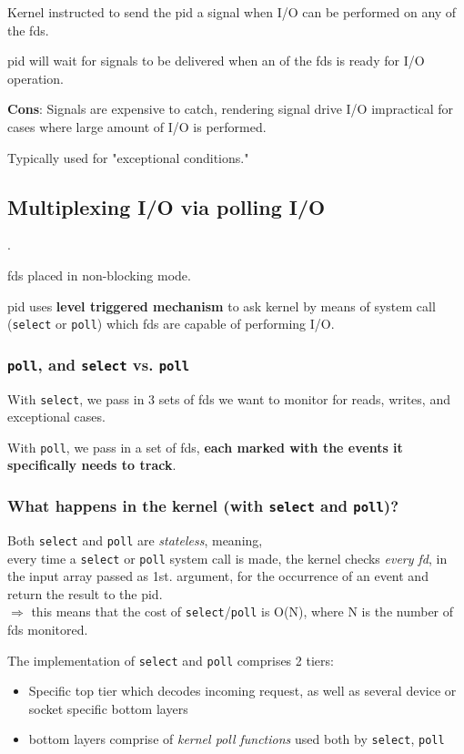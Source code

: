 \documentclass[10pt]{amsart}
\begin{document}
Kernel instructed to send the pid a signal when I/O can be performed on any of the fds.

pid will wait for signals to be delivered when an of the fds is ready for I/O operation.

\textbf{Cons}: Signals are expensive to catch, rendering signal drive I/O impractical for cases where large amount of I/O is performed.

Typically used for "exceptional conditions."

\subsection{Multiplexing I/O via polling I/O}.

fds placed in non-blocking mode.

pid uses \textbf{level triggered mechanism} to ask kernel by means of system call (\texttt{select} or \texttt{poll}) which fds are capable of performing I/O. 

\subsubsection{\texttt{poll}, and \texttt{select} vs. \texttt{poll} }

With \texttt{select}, we pass in 3 sets of fds we want to monitor for reads, writes, and exceptional cases.

With \texttt{poll}, we pass in a set of fds, \textbf{each marked with the events it specifically needs to track}.

\subsubsection{What happens in the kernel (with \texttt{select} and \texttt{poll})?}

Both \texttt{select} and \texttt{poll} are \emph{stateless}, meaning, \\
every time a \texttt{select} or \texttt{poll} system call is made, the kernel checks \emph{every fd}, in the input array passed as 1st. argument, for the occurrence of an event and return the result to the pid. \\
$\Longrightarrow$ this means that the cost of \texttt{select}/\texttt{poll} is O(N), where N is the number of fds monitored.

The implementation of \texttt{select} and \texttt{poll} comprises 2 tiers:
\begin{itemize}
	\item Specific top tier which decodes incoming request, as well as several device or socket specific bottom layers
	\item bottom layers comprise of \emph{kernel poll functions} used both by \texttt{select}, \texttt{poll}
\end{itemize}
\end{document}
